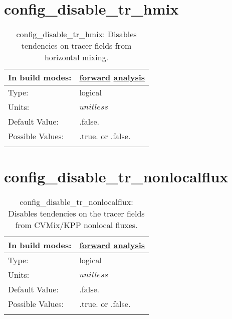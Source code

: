 \section[config\_disable\_tr\_hmix]{config\_disable\_tr\_hmix}
\label{sec:nm_sec_config_disable_tr_hmix}
\begin{center}
\begin{longtable}{| p{2.0in} || p{4.0in} |}
    \hline
    In build modes: & \hyperref[subsec:forward_nm_tab_debug]{forward} \hyperref[subsec:analysis_nm_tab_debug]{analysis} \\
    \hline
    Type: & logical \\
    \hline
    Units: & $unitless$ \\
    \hline
    Default Value: & .false. \\
    \hline
    Possible Values: & .true. or .false. \\
    \hline
    \caption{config\_disable\_tr\_hmix: Disables tendencies on tracer fields from horizontal mixing.}
\end{longtable}
\end{center}
\section[config\_disable\_tr\_nonlocalflux]{config\_disable\_tr\_nonlocalflux}
\label{sec:nm_sec_config_disable_tr_nonlocalflux}
\begin{center}
\begin{longtable}{| p{2.0in} || p{4.0in} |}
    \hline
    In build modes: & \hyperref[subsec:forward_nm_tab_debug]{forward} \hyperref[subsec:analysis_nm_tab_debug]{analysis} \\
    \hline
    Type: & logical \\
    \hline
    Units: & $unitless$ \\
    \hline
    Default Value: & .false. \\
    \hline
    Possible Values: & .true. or .false. \\
    \hline
    \caption{config\_disable\_tr\_nonlocalflux: Disables tendencies on the tracer fields from CVMix/KPP nonlocal fluxes.}
\end{longtable}
\end{center}
